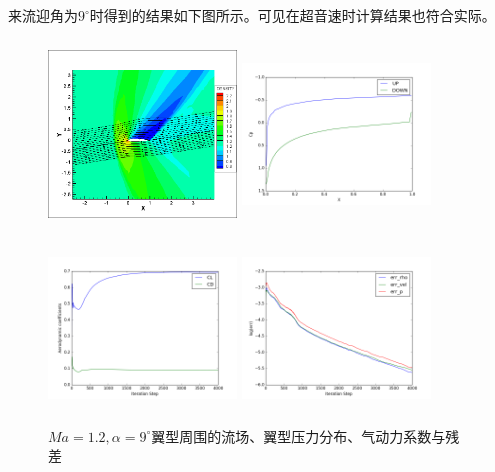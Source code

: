 \documentclass[UTF8]{ctexart}
\begin{document}
\indent 来流迎角为$9^\circ$时得到的结果如下图所示。可见在超音速时计算结果也符合实际。
\begin{figure}[H]\centering
  \begin{minipage}{5.5cm}
    \centering
    \includegraphics[height=5cm,width=5cm]{../pic/1.2_9_flowfield.png}
  \end{minipage}%
  \begin{minipage}{5.5cm}
    \centering
    \includegraphics[height=5cm,width=5cm]{../pic/1.2_9_Cp.png}
  \end{minipage}

  \begin{minipage}{5.5cm}
    \centering
    \includegraphics[height=5cm,width=5cm]{../pic/1.2_9_cl_cd.png}
  \end{minipage}%
  \begin{minipage}{5.5cm}
    \centering
    \includegraphics[height=5cm,width=5cm]{../pic/1.2_9_residual.png}
  \end{minipage}
  \caption{$Ma=1.2,\alpha=9^\circ$翼型周围的流场、翼型压力分布、气动力系数与残差}
\end{figure}
\end{document}
